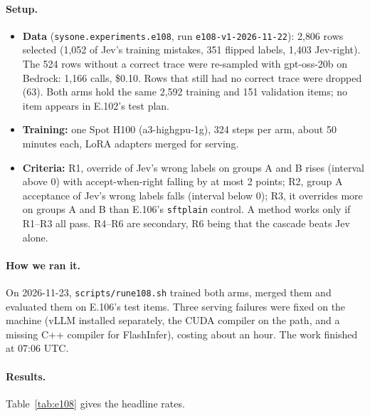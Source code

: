 \documentclass[11pt]{article}
\renewcommand{\_}{\origunderscore\allowbreak}
\begin{document}
\paragraph{Setup.}
\begin{itemize}[leftmargin=*]
  \item \textbf{Data} (\texttt{sysone.experiments.e108}, run \texttt{e108-v1-2026-11-22}): 2{,}806 rows selected (1{,}052 of Jev's training mistakes, 351 flipped labels, 1{,}403 Jev-right). The 524 rows without a correct trace were re-sampled with gpt-oss-20b on Bedrock: 1{,}166 calls, \$0.10. Rows that still had no correct trace were dropped (63). Both arms hold the same 2{,}592 training and 151 validation items; no item appears in E.102's test plan.
  \item \textbf{Training:} one Spot H100 (a3-highgpu-1g), 324 steps per arm, about 50 minutes each, LoRA adapters merged for serving.
  \item \textbf{Criteria:} R1, override of Jev's wrong labels on groups A and B rises (interval above 0) with accept-when-right falling by at most 2 points; R2, group A acceptance of Jev's wrong labels falls (interval below 0); R3, it overrides more on groups A and B than E.106's \texttt{sft\_plain} control. A method works only if R1--R3 all pass. R4--R6 are secondary, R6 being that the cascade beats Jev alone.
\end{itemize}

\paragraph{How we ran it.}
On 2026-11-23, \texttt{scripts/run\_e108.sh} trained both arms, merged them and evaluated them on E.106's test items. Three serving failures were fixed on the machine (vLLM installed separately, the CUDA compiler on the path, and a missing C++ compiler for FlashInfer), costing about an hour. The work finished at 07:06 UTC.

\paragraph{Results.}
Table~\ref{tab:e108} gives the headline rates.
\end{document}
